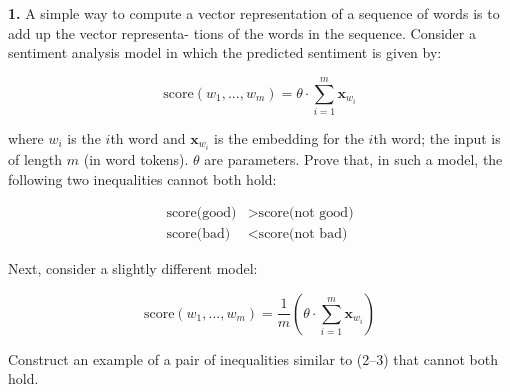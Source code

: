 {\bf 1.} 
A simple way to compute a vector representation of a sequence of words is to add up the vector representa- tions of the words in the sequence. Consider a sentiment analysis model in which the predicted sentiment is given by:

\begin{equation}
    \textrm{score}(w_1, ..., w_m) = \mathbb{\theta} \cdot \sum_{i=1}^{m} \mathbf{x}_{w_i}
\end{equation}

where $w_i$ is the $i$th word and $\mathbf{x}_{w_i}$ is the embedding for the $i$th word; the input is of length $m$ (in word tokens).
$\mathbb{\theta}$ are parameters. 
Prove that, in such a model, the following two inequalities cannot both hold:

\begin{align}
    \textrm{score(good)} &> \textrm{score(not good)} \\
    \textrm{score(bad)} &< \textrm{score(not bad)}
\end{align}



Next, consider a slightly different model:

\begin{equation}
    \textrm{score}(w_1, ..., w_m) = \frac{1}{m} \left( \mathbb{\theta} \cdot \sum_{i=1}^{m} \mathbf{x}_{w_i} \right)
\end{equation}

Construct an example of a pair of inequalities similar to (2–3) that cannot both hold.



